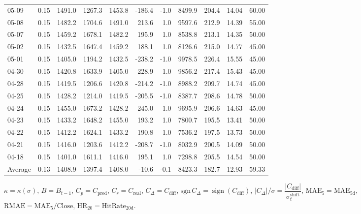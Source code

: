 \begin{threeparttable}
{\begin{tabular}{lrrrrrrrrrr}
05-09 & 0.15 & 1491.0 & 1267.3 & 1453.8 & -186.4 & -1.0 & 8499.9 & 204.4 & 14.04 & 60.00 \\
05-08 & 0.15 & 1482.2 & 1704.6 & 1491.0 & 213.6 & 1.0 & 9597.6 & 212.9 & 14.39 & 55.00 \\
05-07 & 0.15 & 1459.2 & 1678.1 & 1482.2 & 195.9 & 1.0 & 8538.8 & 213.1 & 14.35 & 50.00 \\
05-02 & 0.15 & 1432.5 & 1647.4 & 1459.2 & 188.1 & 1.0 & 8126.6 & 215.0 & 14.77 & 45.00 \\
05-01 & 0.15 & 1405.0 & 1194.2 & 1432.5 & -238.2 & -1.0 & 9978.5 & 226.4 & 15.55 & 45.00 \\
04-30 & 0.15 & 1420.8 & 1633.9 & 1405.0 & 228.9 & 1.0 & 9856.2 & 217.4 & 15.43 & 45.00 \\
04-28 & 0.15 & 1419.5 & 1206.6 & 1420.8 & -214.2 & -1.0 & 8988.2 & 209.7 & 14.74 & 45.00 \\
04-25 & 0.15 & 1428.2 & 1214.0 & 1419.5 & -205.5 & -1.0 & 8387.7 & 208.6 & 14.78 & 50.00 \\
04-24 & 0.15 & 1455.0 & 1673.2 & 1428.2 & 245.0 & 1.0 & 9695.9 & 206.6 & 14.63 & 45.00 \\
04-23 & 0.15 & 1433.2 & 1648.2 & 1455.0 & 193.2 & 1.0 & 7800.7 & 195.5 & 13.41 & 50.00 \\
04-22 & 0.15 & 1412.2 & 1624.1 & 1433.2 & 190.8 & 1.0 & 7536.2 & 197.5 & 13.73 & 50.00 \\
04-21 & 0.15 & 1416.0 & 1203.6 & 1412.2 & -208.7 & -1.0 & 8032.9 & 200.5 & 14.09 & 50.00 \\
04-18 & 0.15 & 1401.0 & 1611.1 & 1416.0 & 195.1 & 1.0 & 7298.8 & 205.5 & 14.54 & 50.00 \\
Average & 0.13 & 1408.9 & 1397.4 & 1408.0 & -10.6 & -0.1 & 8423.3 & 182.7 & 12.93 & 59.33 \\
\bottomrule
\end{tabular}
}%
\begin{tablenotes}\footnotesize
\item $\kappa=\kappa(\sigma)$, $B=B_{t-1}$, $C_p=C_{\text{pred}}$, $C_r=C_{\text{real}}$, $C_\Delta=C_{\text{diff}}$, $\mathrm{sgn}\,C_\Delta=\operatorname{sign}(C_{\text{diff}})$, $|C_\Delta|/\sigma=\dfrac{|C_{\text{diff}}|}{\sigma_t^{\text{shift}}}$, $\mathrm{MAE}_5=\mathrm{MAE}_{5\text{d}}$, $\mathrm{RMAE}= \mathrm{MAE}_5 / \text{Close}$, $\mathrm{HR}_{20}=\mathrm{HitRate}_{20\text{d}}$.
\end{tablenotes}
\end{threeparttable}
\endgroup